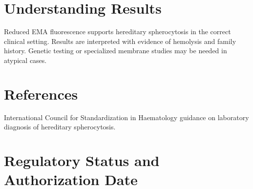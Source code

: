 \section*{Understanding Results}
Reduced EMA fluorescence supports hereditary spherocytosis in the correct clinical setting. Results are interpreted with evidence of hemolysis and family history. Genetic testing or specialized membrane studies may be needed in atypical cases.

\section*{References}
International Council for Standardization in Haematology guidance on laboratory diagnosis of hereditary spherocytosis.

\clearpage


\section*{Regulatory Status and Authorization Date}

\clearpage
